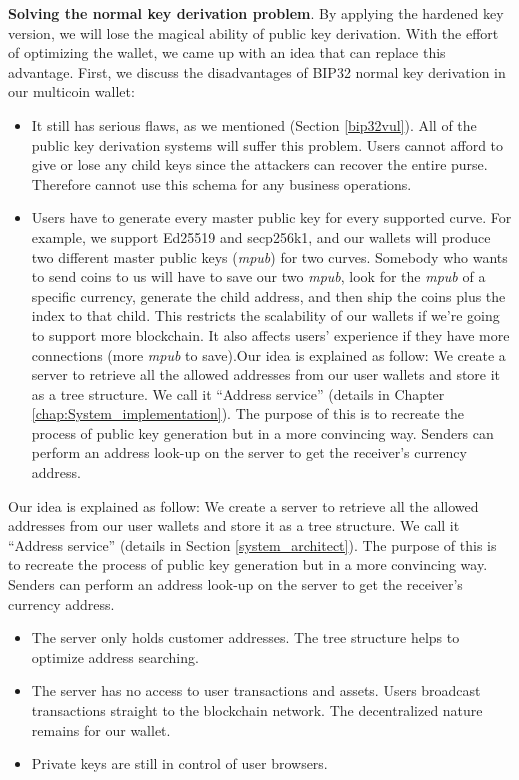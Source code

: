 \bigskip
{\textbf{Solving the normal key derivation problem}}. By applying the hardened key version, we will lose the magical ability of public key derivation. With the effort of optimizing the wallet, we came up with an idea that can replace this advantage. First, we discuss the disadvantages of BIP32 normal key derivation in our multicoin wallet:

\begin{itemize}
    \item It still has serious flaws, as we mentioned (Section \ref{bip32vul}). All of the public key derivation systems will suffer this problem. Users cannot afford to give or lose any child keys since the attackers can recover the entire purse. Therefore cannot use this schema for any business operations.

    \item Users have to generate every master public key for every supported curve. For example, we support Ed25519 and secp256k1, and our wallets will produce two different master public keys (\textit{mpub}) for two curves. Somebody who wants to send coins to us will have to save our two \textit{mpub}, look for the \textit{mpub} of a specific currency, generate the child address, and then ship the coins plus the index to that child. This restricts the scalability of our wallets if we're going to support more blockchain. It also affects users' experience if they have more connections (more \textit{mpub} to save).Our idea is explained as follow:
            We create a server to retrieve all the allowed addresses from our user wallets and store it as a tree structure. We call it “Address service” (details in Chapter \ref{chap:System_implementation}). The purpose of this is to recreate the process of public key generation but in a more convincing way. Senders can perform an address look-up on the server to get the receiver’s currency address.

\end{itemize}

Our idea is explained as follow:
We create a server to retrieve all the allowed addresses from our user wallets and store it as a tree structure. We call it “Address service” (details in Section \ref{system_architect}). The purpose of this is to recreate the process of public key generation but in a more convincing way. Senders can perform an address look-up on the server to get the receiver’s currency address.

\begin{itemize}
    \item The server only holds customer addresses. The tree structure helps to optimize address searching.
    \item The server has no access to user transactions and assets. Users broadcast transactions straight to the blockchain network. The decentralized nature remains for our wallet.
    \item Private keys are still in control of user browsers.
\end{itemize}

